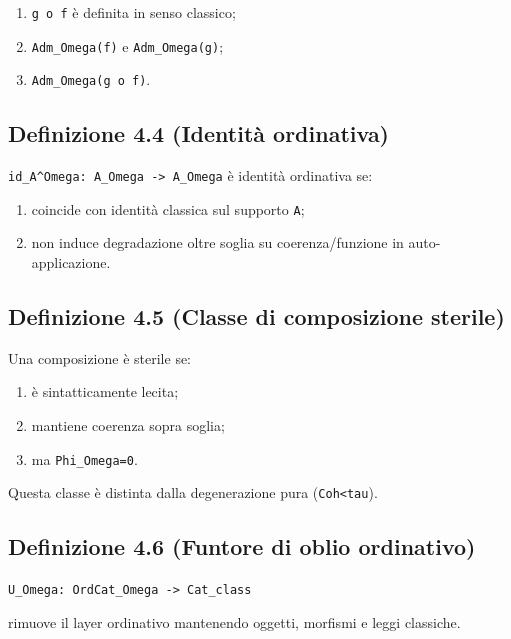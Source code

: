 \begin{enumerate}
\def\labelenumi{\arabic{enumi}.}
\tightlist
\item
  \texttt{g\ o\ f} è definita in senso classico;
\item
  \texttt{Adm\_Omega(f)} e \texttt{Adm\_Omega(g)};
\item
  \texttt{Adm\_Omega(g\ o\ f)}.
\end{enumerate}

\subsection{Definizione 4.4 (Identità ordinativa)}

\texttt{id\_A\^{}Omega:\ A\_Omega\ -\textgreater{}\ A\_Omega} è identità ordinativa se:

\begin{enumerate}
\def\labelenumi{\arabic{enumi}.}
\tightlist
\item
  coincide con identità classica sul supporto \texttt{A};
\item
  non induce degradazione oltre soglia su coerenza/funzione in auto-applicazione.
\end{enumerate}

\subsection{Definizione 4.5 (Classe di composizione sterile)}

Una composizione è sterile se:

\begin{enumerate}
\def\labelenumi{\arabic{enumi}.}
\tightlist
\item
  è sintatticamente lecita;
\item
  mantiene coerenza sopra soglia;
\item
  ma \texttt{Phi\_Omega=0}.
\end{enumerate}

Questa classe è distinta dalla degenerazione pura (\texttt{Coh\textless{}tau}).

\subsection{Definizione 4.6 (Funtore di oblio ordinativo)}

\texttt{U\_Omega:\ OrdCat\_Omega\ -\textgreater{}\ Cat\_class}

rimuove il layer ordinativo mantenendo oggetti, morfismi e leggi classiche.

